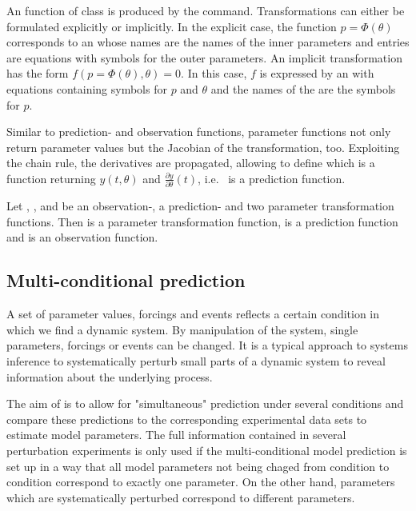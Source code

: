 \documentclass[article]{jss}
\begin{document}
An  function of class  is produced by the  command. Transformations can either be formulated explicitly or implicitly. In the explicit case, the function $p = \Phi(\theta)$ corresponds to an  whose names are the names of the inner parameters and entries are equations with symbols for the outer parameters. An implicit transformation has the form $f(p = \Phi(\theta), \theta) = 0$. In this case, $f$ is expressed by an  with equations containing symbols for $p$ and $\theta$ and the names of the  are the symbols for $p$.

Similar to prediction- and observation functions, parameter functions not only return parameter values but the Jacobian of the transformation, too. Exploiting the chain rule, the derivatives are propagated, allowing to define  which is a function returning $y(t, \theta)$ and $\frac{\partial y}{\partial \theta}(t)$, i.e.~ is a prediction function.

Let , ,  and  be an observation-, a prediction- and two parameter transformation functions. Then  is a parameter transformation function,  is a prediction function and  is an observation function.

\subsection{Multi-conditional prediction}

A set of parameter values, forcings and events reflects a certain condition in which we find a dynamic system. By manipulation of the system, single parameters, forcings or events can be changed. It is a typical approach to systems inference to systematically perturb small parts of a dynamic system to reveal information about the underlying process. 

The aim of  is to allow for "simultaneous" prediction under several conditions and compare these predictions to the corresponding experimental data sets to estimate model parameters. The full information contained in several perturbation experiments is only used if the multi-conditional model prediction is set up in a way that all model parameters not being chaged from condition to condition correspond to exactly one parameter. On the other hand, parameters which are systematically perturbed correspond to different parameters.
\end{document}
